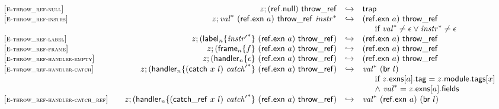 $$
\begin{array}[t]{@{}lrcl@{}l@{}}
{[\textsc{\scriptsize E{-}throw\_ref{-}null}]} \quad & z ; (\mathsf{ref{.}null})~\mathsf{throw\_ref} & \hookrightarrow & \mathsf{trap} \\
{[\textsc{\scriptsize E{-}throw\_ref{-}instrs}]} \quad & z ; {{\mathit{val}}^\ast}~(\mathsf{ref{.}exn}~a)~\mathsf{throw\_ref}~{{\mathit{instr}}^\ast} & \hookrightarrow & (\mathsf{ref{.}exn}~a)~\mathsf{throw\_ref} &  \\
&&& \multicolumn{2}{@{}l@{}}{\quad
\quad \mbox{if}~ {{\mathit{val}}^\ast} \neq \epsilon \lor {{\mathit{instr}}^\ast} \neq \epsilon
} \\
{[\textsc{\scriptsize E{-}throw\_ref{-}label}]} \quad & z ; ({{\mathsf{label}}_{n}}{\{ {{\mathit{instr}'}^\ast} \}}~(\mathsf{ref{.}exn}~a)~\mathsf{throw\_ref}) & \hookrightarrow & (\mathsf{ref{.}exn}~a)~\mathsf{throw\_ref} \\
{[\textsc{\scriptsize E{-}throw\_ref{-}frame}]} \quad & z ; ({{\mathsf{frame}}_{n}}{\{ f \}}~(\mathsf{ref{.}exn}~a)~\mathsf{throw\_ref}) & \hookrightarrow & (\mathsf{ref{.}exn}~a)~\mathsf{throw\_ref} \\
{[\textsc{\scriptsize E{-}throw\_ref{-}handler{-}empty}]} \quad & z ; ({{\mathsf{handler}}_{n}}{\{ \epsilon \}}~(\mathsf{ref{.}exn}~a)~\mathsf{throw\_ref}) & \hookrightarrow & (\mathsf{ref{.}exn}~a)~\mathsf{throw\_ref} \\
{[\textsc{\scriptsize E{-}throw\_ref{-}handler{-}catch}]} \quad & z ; ({{\mathsf{handler}}_{n}}{\{ (\mathsf{catch}~x~l)~{{\mathit{catch}'}^\ast} \}}~(\mathsf{ref{.}exn}~a)~\mathsf{throw\_ref}) & \hookrightarrow & {{\mathit{val}}^\ast}~(\mathsf{br}~l) &  \\
&&& \multicolumn{2}{@{}l@{}}{\quad
\quad
\begin{array}[t]{@{}l@{}}
\mbox{if}~ z{.}\mathsf{exns}{}[a]{.}\mathsf{tag} = z{.}\mathsf{module}{.}\mathsf{tags}{}[x] \\
{\land}~ {{\mathit{val}}^\ast} = z{.}\mathsf{exns}{}[a]{.}\mathsf{fields} \\
\end{array}
} \\
{[\textsc{\scriptsize E{-}throw\_ref{-}handler{-}catch\_ref}]} \quad & z ; ({{\mathsf{handler}}_{n}}{\{ (\mathsf{catch\_ref}~x~l)~{{\mathit{catch}'}^\ast} \}}~(\mathsf{ref{.}exn}~a)~\mathsf{throw\_ref}) & \hookrightarrow & {{\mathit{val}}^\ast}~(\mathsf{ref{.}exn}~a)~(\mathsf{br}~l) &  \\
&&& \multicolumn{2}{@{}l@{}}{\quad
\quad
\begin{array}[t]{@{}l@{}}

\end{array}}
\end{array}$$
